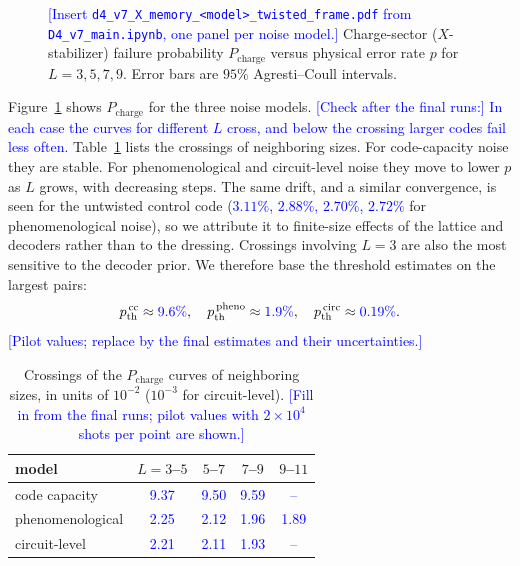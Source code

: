 \documentclass[a4paper]{article}
\newcommand{\blue}[1]{\textcolor{blue}{#1}}
\newcommand{\pth}{p_{\mathrm{th}}}
\begin{document}
\begin{figure}[t]
  \centering
  \fbox{\rule{0pt}{50mm}\rule{0.82\linewidth}{0pt}}
  \caption{\blue{[Insert \texttt{d4\_v7\_X\_memory\_<model>\_twisted\_frame.pdf} from \texttt{D4\_v7\_main.ipynb}, one panel per noise model.]} Charge-sector ($X$-stabilizer) failure probability $P_{\mathrm{charge}}$ versus physical error rate $p$ for $L=3,5,7,9$. Error bars are $95\%$ Agresti--Coull intervals.}
  \label{fig:threshold}
\end{figure}

Figure~\ref{fig:threshold} shows $P_{\mathrm{charge}}$ for the three noise models. \blue{[Check after the final runs:] In each case the curves for different $L$ cross, and below the crossing larger codes fail less often.} Table~\ref{tab:thresholds} lists the crossings of neighboring sizes. For code-capacity noise they are stable. For phenomenological and circuit-level noise they move to lower $p$ as $L$ grows, with decreasing steps. The same drift, and a similar convergence, is seen for the untwisted control code (\blue{$3.11\%$, $2.88\%$, $2.70\%$, $2.72\%$} for phenomenological noise), so we attribute it to finite-size effects of the lattice and decoders rather than to the dressing. Crossings involving $L=3$ are also the most sensitive to the decoder prior. We therefore base the threshold estimates on the largest pairs:
\begin{equation}
  \pth^{\,\mathrm{cc}}\approx\blue{9.6\%},\quad
  \pth^{\,\mathrm{pheno}}\approx\blue{1.9\%},\quad
  \pth^{\,\mathrm{circ}}\approx\blue{0.19\%}.
\end{equation}
\blue{[Pilot values; replace by the final estimates and their uncertainties.]}

\begin{table}[t]
\centering
\caption{Crossings of the $P_{\mathrm{charge}}$ curves of neighboring sizes, in units of $10^{-2}$ ($10^{-3}$ for circuit-level). \blue{[Fill in from the final runs; pilot values with $2\times10^4$ shots per point are shown.]}}
\label{tab:thresholds}
\begin{tabular}{lcccc}
\hline
model & $L=3$--$5$ & $5$--$7$ & $7$--$9$ & $9$--$11$\\
\hline
code capacity & \blue{9.37} & \blue{9.50} & \blue{9.59} & \blue{--}\\
phenomenological & \blue{2.25} & \blue{2.12} & \blue{1.96} & \blue{1.89}\\
circuit-level & \blue{2.21} & \blue{2.11} & \blue{1.93} & \blue{--}\\
\hline
\end{tabular}
\end{table}
\end{document}
